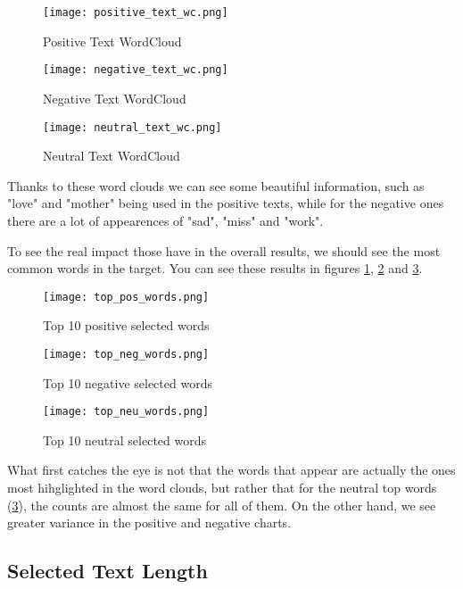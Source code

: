 \documentclass[11pt]{article}
\begin{document}
\begin{figure}[h]
\centering
\texttt{[image: positive\_text\_wc.png]}
\caption{Positive Text WordCloud}
\end{figure}



\begin{figure}[h]
\centering
\texttt{[image: negative\_text\_wc.png]}
\caption{Negative Text WordCloud}
\end{figure}



\begin{figure}[h]
\centering
\texttt{[image: neutral\_text\_wc.png]}
\caption{Neutral Text WordCloud}
\end{figure}


Thanks to these word clouds we can see some beautiful information, such as "love" and "mother" being used in the positive texts, while for the negative ones there are a lot of appearences of "sad", "miss" and "work".

To see the real impact those have in the overall results, we should see the most common words in the target. You can see these results in figures \ref{fig:10pos}, \ref{fig:10neg} and \ref{fig:10neu}.

\begin{figure}[!htb]
\centering
\texttt{[image: top\_pos\_words.png]}
\caption{Top 10 positive selected words}
\label{fig:10pos}
\end{figure}

\begin{figure}[!htb]
\centering
\texttt{[image: top\_neg\_words.png]}
\caption{Top 10 negative selected words}
\label{fig:10neg}
\end{figure}

\begin{figure}[!htb]
\centering
\texttt{[image: top\_neu\_words.png]}
\caption{Top 10 neutral selected words}
\label{fig:10neu}
\end{figure}

What first catches the eye is not that the words that appear are actually the ones most hihglighted in the word clouds, but rather that for the neutral top words (\ref{fig:10neu}), the counts are almost the same for all of them. On the other hand, we see greater variance in the positive and negative charts.

\subsection{Selected Text Length}
\end{document}
